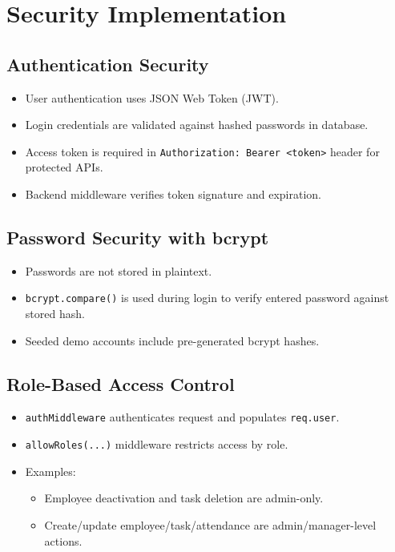 \chapter{Security Implementation}

\section{Authentication Security}
\begin{itemize}[leftmargin=1.3cm]
\item User authentication uses JSON Web Token (JWT).
\item Login credentials are validated against hashed passwords in database.
\item Access token is required in \texttt{Authorization: Bearer <token>} header for protected APIs.
\item Backend middleware verifies token signature and expiration.
\end{itemize}

\section{Password Security with bcrypt}
\begin{itemize}[leftmargin=1.3cm]
\item Passwords are not stored in plaintext.
\item \texttt{bcrypt.compare()} is used during login to verify entered password against stored hash.
\item Seeded demo accounts include pre-generated bcrypt hashes.
\end{itemize}

\section{Role-Based Access Control}
\begin{itemize}[leftmargin=1.3cm]
\item \texttt{authMiddleware} authenticates request and populates \texttt{req.user}.
\item \texttt{allowRoles(...)} middleware restricts access by role.
\item Examples:
  \begin{itemize}[leftmargin=1.1cm]
  \item Employee deactivation and task deletion are admin-only.
  \item Create/update employee/task/attendance are admin/manager-level actions.
  \end{itemize}
\end{itemize}

